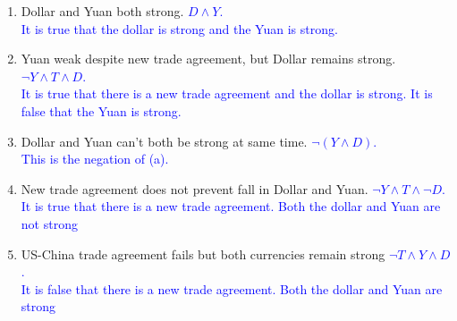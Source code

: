 \documentclass[13.5pt]{article}
\begin{document}
\begin{enumerate}
\begin{enumerate}
\item {Dollar and Yuan both strong.} \textcolor{blue}{\(D \wedge Y\).}\\
\textcolor{blue}{It is true that the dollar is strong and the Yuan is strong.}
\item {Yuan weak despite new trade agreement, but Dollar remains strong.} \textcolor{blue}{\( \neg Y \wedge T \wedge D\).}\\
\textcolor{blue}{It is true that there is a new trade agreement and the dollar is strong. It is false that the Yuan is strong.}
\item {Dollar and Yuan can't both be strong at same time.} \textcolor{blue}{\( \neg (Y \wedge D)\).}\\
\textcolor{blue}{This is the negation of (a).}
\item {New trade agreement does not prevent fall in Dollar and Yuan.} \textcolor{blue}{\( \neg Y \wedge T \wedge \neg D\).}\\
\textcolor{blue}{It is true that there is a new trade agreement. Both the dollar and Yuan are not strong}
\item {US-China trade agreement fails but both currencies remain strong} \textcolor{blue}{\( \neg T \wedge Y \wedge D\).}\\
\textcolor{blue}{It is false that there is a new trade agreement. Both the dollar and Yuan are strong}
\end{enumerate}

\end{enumerate}
\end{document}
